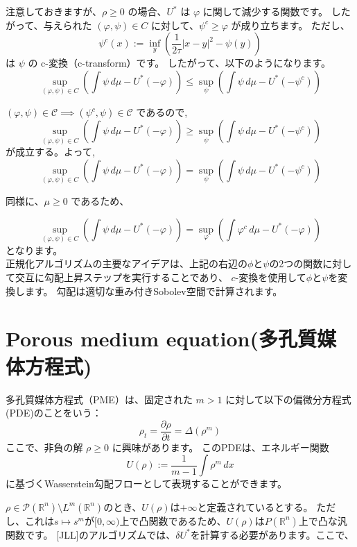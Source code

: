 \documentclass{jsarticle}
\theoremstyle{definition}
\begin{document}
注意しておきますが、\(\rho \geq 0\) の場合、\(U^*\) は \(\varphi\) に関して減少する関数です。
{\color{teal}
したがって、与えられた \((\varphi, \psi) \in C\) に対して、\(\psi^c \geq \varphi\) が成り立ちます。
}
ただし、
\[
  \psi^c(x) := \inf_y \left( \frac{1}{2\tau}|x-y|^2 - \psi(y)\right)
\]
は \(\psi\) の c-変換（c-transform）です。
{\color{teal}したがって、以下のようになります。}
\[
\sup_{(\varphi, \psi) \in C} \left(\int \psi \, d\mu - U^*(- \varphi)\right) \le \sup_\psi \left(\int \psi \, d\mu - U^*(- \psi^c)\right)
\]

$(\varphi, \psi) \in \mathcal{C} \implies (\psi^c, \psi) \in \mathcal{C}$
であるので,
\[
\sup_{(\varphi, \psi) \in C} \left(\int \psi \, d\mu - U^*(- \varphi)\right) \ge \sup_\psi \left(\int \psi \, d\mu - U^*(- \psi^c)\right)
\]
が成立する。よって,
\begin{equation}
  \label{eq:psi^c}
\sup_{(\varphi, \psi) \in C} \left(\int \psi \, d\mu - U^*(- \varphi)\right) = \sup_\psi \left(\int \psi \, d\mu - U^*(- \psi^c)\right)
\end{equation}

同様に、\(\mu \geq 0\) であるため、

\begin{equation}
  \label{eq:phi^c}
  \sup_{(\varphi, \psi) \in C} \left(\int \psi \, d\mu - U^*(- \varphi)\right) = \sup_\varphi \left(\int \varphi^c \, d\mu - U^*(- \varphi)\right)
\end{equation}
となります。\\

正規化アルゴリズムの主要なアイデアは、上記の右辺の$\phi$と$\psi$の2つの関数に対して交互に勾配上昇ステップを実行することであり、
$c$-変換を使用して$\phi$と$\psi$を変換します。
勾配は適切な重み付きSobolev空間で計算されます。

\section{Porous medium equation(多孔質媒体方程式)}

多孔質媒体方程式（PME）は、固定された \(m > 1\) に対して以下の偏微分方程式(PDE)のことをいう：
\[
\rho_t = \frac{{\partial \rho}}{{\partial t}} = \Delta (\rho^m)
\]
ここで、非負の解 \(\rho \geq 0\) に興味があります。
このPDEは、エネルギー関数
\[
U(\rho) := \frac{1}{{m-1}} \int \rho^m \, dx
\]
に基づくWasserstein勾配フローとして表現することができます。

$\rho \in \mathcal{P}(\mathbb{R}^n) \setminus L^m(\mathbb{R}^n)$のとき、$U(\rho)$は$+\infty$と定義されているとする。
ただし、これは$s \mapsto s^m$が$[0, \infty)$上で凸関数であるため、$U(\rho)$は$P(\mathbb{R}^n)$上で凸な汎関数です。
[JLL]のアルゴリズムでは、$\delta U^*$を計算する必要があります。ここで、
\end{document}
